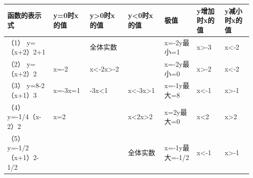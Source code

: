 {\def\LTcaptype{none} %
\begin{longtable}[]{@{}
  >{\raggedright\arraybackslash}p{}
  >{\raggedright\arraybackslash}p{}
  >{\raggedright\arraybackslash}p{}
  >{\raggedright\arraybackslash}p{}
  >{\raggedright\arraybackslash}p{}
  >{\raggedright\arraybackslash}p{}
  >{\raggedright\arraybackslash}p{}@{}}
\toprule\noalign{}
\begin{minipage}[b]{\linewidth}\raggedright
函数的表示式
\end{minipage} & \begin{minipage}[b]{\linewidth}\raggedright
y=0时x的值
\end{minipage} & \begin{minipage}[b]{\linewidth}\raggedright
y\textgreater0时x的值
\end{minipage} & \begin{minipage}[b]{\linewidth}\raggedright
y\textless0时x的值
\end{minipage} & \begin{minipage}[b]{\linewidth}\raggedright
极值
\end{minipage} & \begin{minipage}[b]{\linewidth}\raggedright
y增加时x的值
\end{minipage} & \begin{minipage}[b]{\linewidth}\raggedright
y减小时x的值
\end{minipage} \\
\midrule\noalign{}
\endhead
\bottomrule\noalign{}
\endlastfoot
（1） y=（x+2）2+1 & & 全体实数 & & x=-2y最小=1 & x\textgreater-3 &
x\textless-2 \\
（2） y=（x+2）2 & x=-2 & x\textless-2x\textgreater-2 & & x=-2y最小=0 &
x\textgreater-2 & x\textless-2 \\
（3） y=8-2（x+1）3 & x=-3x=1 & -3x\textless1 &
x\textless-3x\textgreater1 & x=-1y最大=8 & x\textless-1 &
x\textgreater-1 \\
（4） y=-1/4（x-2）2 & x=2 & & x\textless2x\textgreater2 & x=2y最大=0 &
x\textless2 & x\textgreater2 \\
（5） y=-1/2（x+1）2-1/2 & & & 全体实数 & x=-1y最大=-1/2 & x\textless-1
& x\textgreater-1 \\
\end{longtable}
}

